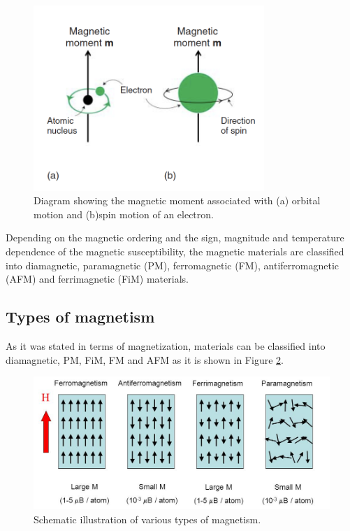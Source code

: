 \begin{figure}[H]
\centering
\captionsetup{justification=centering,margin=2cm}
	\includegraphics[height=70mm]{fig/review/electron.png}
	\caption[Diagram showing the magnetic moment associated with orbital and spin motion of an electron.]{Diagram showing the magnetic moment associated with (a) orbital motion and (b)spin motion of an electron.}
\label{fig:electron}
\end{figure}

Depending on the magnetic ordering and the sign, magnitude and
temperature dependence of the magnetic susceptibility, the magnetic materials are classified into diamagnetic, paramagnetic (PM), ferromagnetic (FM), antiferromagnetic (AFM) and ferrimagnetic (FiM) materials.

\subsection{Types of magnetism}\label{sec:ordering}
As it was stated in terms of magnetization, materials can be classified into diamagnetic, PM, FiM,  FM and AFM as it is shown in Figure \ref{fig:magneticorder}.

\begin{figure}[H]
	\centering
	\includegraphics[width=130mm]{fig/review/magneticorder.png}
	\caption[Schematic illustration of various types of magnetism.]{Schematic illustration of various types of magnetism.}
\label{fig:magneticorder}
\end{figure}

